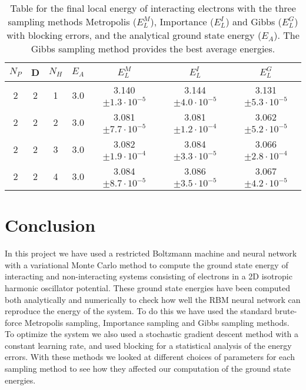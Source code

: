 \documentclass[12pt,a4paper,english]{article}
\begin{document}
\begin{table}[htbp!]
	\centering
	\begin{tabular}{ |c|c|c|c|c|c|c| }
		\hline \rule{0pt}{14pt}
		$N_P$ & D & $N_H$ & $E_A$ & $E_L^M$ & $E_L^I$ & $E_L^G$ \\
		\hline \rule{0pt}{13pt}%
		2 & 2 & 1 & 3.0 & 3.140$\pm1.3\cdot10^{-5}$ & 3.144$\pm4.0\cdot10^{-5}$ & 3.131$\pm5.3\cdot10^{-5}$ \\
		2 & 2 & 2 & 3.0 & 3.081$\pm7.7\cdot10^{-5}$ & 3.081$\pm1.2\cdot10^{-4}$ & 3.062$\pm5.2\cdot10^{-5}$ \\
		2 & 2 & 3 & 3.0 & 3.082$\pm1.9\cdot10^{-4}$ & 3.084$\pm3.3\cdot10^{-5}$ & 3.066$\pm2.8\cdot10^{-4}$ \\
		2 & 2 & 4 & 3.0 & 3.084$\pm8.7\cdot10^{-5}$ & 3.086$\pm3.5\cdot10^{-5}$ & 3.067$\pm4.2\cdot10^{-5}$ \\
		\hline
	\end{tabular}	
	\caption{Table for the final local energy of interacting electrons with the three sampling methods Metropolis ($E_L^M$), Importance ($E_L^I$) and Gibbs ($E_L^G$) with blocking errors, and the analytical ground state energy ($E_A$). The Gibbs sampling method provides the best average energies. \label{tab:Int_energies}}
\end{table}


\section{Conclusion}
\label{sect:Conclusion}
In this project we have used a restricted Boltzmann machine and neural network with a variational Monte Carlo method to compute the ground state energy of interacting and non-interacting systems consisting of electrons in a 2D isotropic harmonic oscillator potential. These ground state energies have been computed both analytically and numerically to check how well the RBM neural network can reproduce the energy of the system. To do this we have used the standard brute-force Metropolis sampling, Importance sampling and Gibbs sampling methods. To optimize the system we also used a stochastic gradient descent method with a constant learning rate, and used blocking for a statistical analysis of the energy errors. With these methods we looked at different choices of parameters for each sampling method to see how they affected our computation of the ground state energies.
\end{document}
